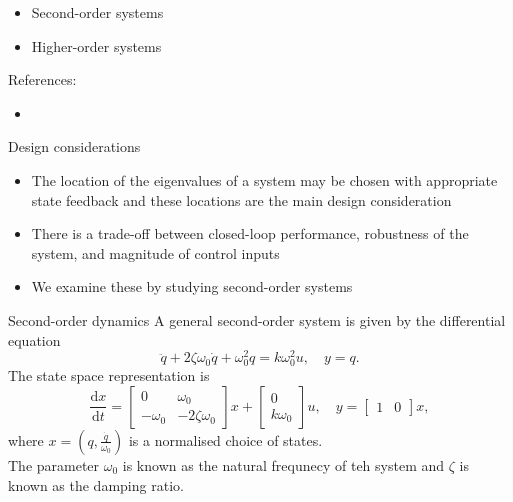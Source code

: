 \documentclass{beamer-control}
\begin{document}

\begin{SUMMARY}
\begin{itemize}
\item Second-order systems
\item Higher-order systems
\end{itemize}
\vfill References:
\begin{itemize}
\item {}
\end{itemize}
\end{SUMMARY}





\begin{frame}{Design considerations}
\begin{itemize}
\item The location of the eigenvalues of a system may be chosen with appropriate state feedback and these locations are the main design consideration
\item There is a trade-off between closed-loop performance, robustness of the system, and magnitude of control inputs
\item We examine these by studying second-order systems
\end{itemize}
\end{frame}


\begin{frame}{Second-order dynamics}
A general second-order system is given by the differential equation
\[\ddot{q}+2\zeta \omega_0 \dot{q}+\omega_0^2q=k\omega_0^2u, \quad y=q.\]
The state space representation is 
\[\frac{\mathrm{d} x}{\mathrm{d} t}=\begin{bmatrix}
	0 & \omega_0 \\
	-\omega_0 & -2 \zeta \omega_0
\end{bmatrix} x+\begin{bmatrix} 0 \\
k \omega_0 
\end{bmatrix}u, \quad y=\begin{bmatrix}
	1 & 0
\end{bmatrix} x,\]
where $x=\left(q,\tfrac{\dot{q}}{\omega_0}\right)$ is a normalised choice of states.\\
The parameter $\omega_0$ is known as the natural frequnecy of teh system and $\zeta$ is known as the damping ratio.
\end{frame}
\end{document}
